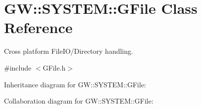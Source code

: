 \hypertarget{classGW_1_1SYSTEM_1_1GFile}{}\section{GW\+:\+:S\+Y\+S\+T\+EM\+:\+:G\+File Class Reference}
\label{classGW_1_1SYSTEM_1_1GFile}


Cross platform File\+I\+O/\+Directory handling.  




{\ttfamily \#include $<$G\+File.\+h$>$}



Inheritance diagram for GW\+:\+:S\+Y\+S\+T\+EM\+:\+:G\+File\+:


Collaboration diagram for GW\+:\+:S\+Y\+S\+T\+EM\+:\+:G\+File\+:
